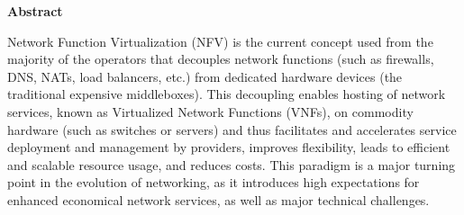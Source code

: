 \thispagestyle{empty}


\begin{center}
\large
{\bf Abstract}\\[5mm]
\end{center}
Network Function Virtualization (NFV) is the current concept used from the majority of the operators that decouples
network functions (such as firewalls, DNS, NATs, load balancers, etc.) from dedicated
hardware devices (the traditional expensive middleboxes). This decoupling enables hosting
of network services, known as Virtualized Network Functions (VNFs), on commodity hardware (such as switches or servers) and thus facilitates and accelerates service deployment
and management by providers, improves flexibility, leads to efficient and scalable resource
usage, and reduces costs. This paradigm is a major turning point in the evolution of networking, as it introduces high expectations for enhanced economical network services, as
well as major technical challenges.

